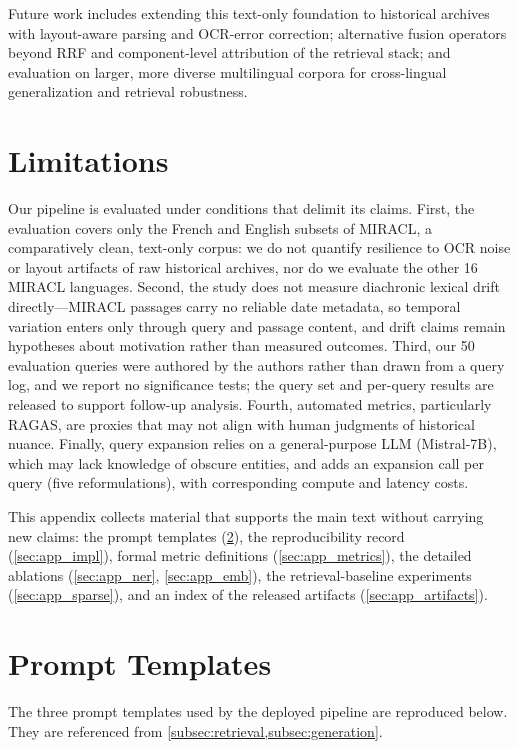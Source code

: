 \documentclass[11pt]{article}
\begin{document}
Future work includes extending this text-only foundation to historical archives with layout-aware parsing and OCR-error correction; alternative fusion operators beyond RRF and component-level attribution of the retrieval stack; and evaluation on larger, more diverse multilingual corpora for cross-lingual generalization and retrieval robustness.

\section{Limitations}
\label{sec:limitations}
Our pipeline is evaluated under conditions that delimit its claims. First, the evaluation covers only the French and English subsets of MIRACL, a comparatively clean, text-only corpus: we do not quantify resilience to OCR noise or layout artifacts of raw historical archives, nor do we evaluate the other 16 MIRACL languages. Second, the study does not measure diachronic lexical drift directly---MIRACL passages carry no reliable date metadata, so temporal variation enters only through query and passage content, and drift claims remain hypotheses about motivation rather than measured outcomes. Third, our 50 evaluation queries were authored by the authors rather than drawn from a query log, and we report no significance tests; the query set and per-query results are released to support follow-up analysis. Fourth, automated metrics, particularly RAGAS, are proxies that may not align with human judgments of historical nuance. Finally, query expansion relies on a general-purpose LLM (Mistral-7B), which may lack knowledge of obscure entities, and adds an expansion call per query (five reformulations), with corresponding compute and latency costs.

% 

\clearpage
\appendix
This appendix collects material that supports the main text without carrying new claims: the prompt templates (\ref{sec:appendix_prompts}), the reproducibility record (\ref{sec:app_impl}), formal metric definitions (\ref{sec:app_metrics}), the detailed ablations (\ref{sec:app_ner}, \ref{sec:app_emb}), the retrieval-baseline experiments (\ref{sec:app_sparse}), and an index of the released artifacts (\ref{sec:app_artifacts}).

\section{Prompt Templates}
\label{sec:appendix_prompts}
The three prompt templates used by the deployed pipeline are reproduced below.
They are referenced from \cref{subsec:retrieval,subsec:generation}.
\end{document}
